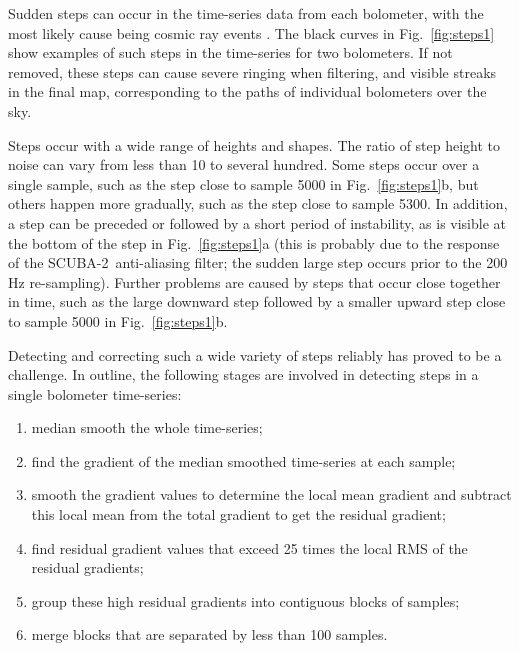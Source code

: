 \documentclass[useAMS,usenatbib,nofootinbib]{mn2e}
\newcommand{\scuba}{SCUBA-2}
\begin{document}
Sudden steps can occur in the time-series data from each bolometer,
with the most likely cause being cosmic ray events \citep[see
Section~3.5.3 in][]{holland2012}. The black curves in
Fig.~\ref{fig:steps1} show examples of such steps in the time-series
for two bolometers. If not removed, these steps can cause severe
ringing when filtering, and visible streaks in the final map,
corresponding to the paths of individual bolometers over the sky.

Steps occur with a wide range of heights and shapes. The ratio of step
height to noise can vary from less than 10 to several hundred. Some
steps occur over a single sample, such as the step close to sample
5000 in Fig.~\ref{fig:steps1}b, but others happen more gradually, such
as the step close to sample 5300. In addition, a step can be preceded
or followed by a short period of instability, as is visible at the
bottom of the step in Fig.~\ref{fig:steps1}a (this is probably due to
the response of the \scuba\ anti-aliasing filter; the sudden large
step occurs prior to the 200\,Hz re-sampling). Further problems are
caused by steps that occur close together in time, such as the large
downward step followed by a smaller upward step close to sample 5000
in Fig.~\ref{fig:steps1}b.

Detecting and correcting such a wide variety of steps reliably has
proved to be a challenge. In outline, the following stages are
involved in detecting steps in a single bolometer time-series:

\begin{enumerate}

\item median smooth the whole time-series;

\item find the gradient of the median smoothed time-series at each
sample;

\item smooth the gradient values to determine the local mean gradient
and subtract this local mean from the total gradient to get the
residual gradient;

\item find residual gradient values that exceed 25 times the local RMS
of the residual gradients;

\item group these high residual gradients into contiguous blocks of
samples;

\item merge blocks that are separated by less than 100 samples.
\end{enumerate}
\end{document}

